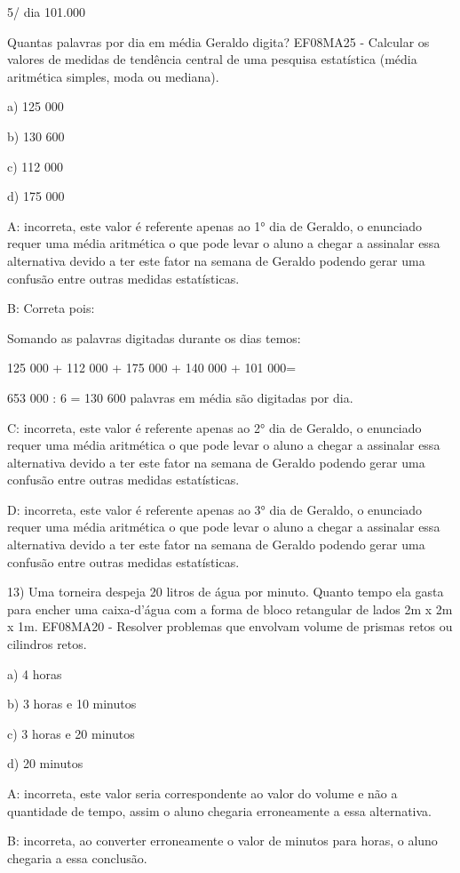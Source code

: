 {5/ dia 101.000

Quantas palavras por dia em média Geraldo digita? EF08MA25 - Calcular os
valores de medidas de tendência central de uma pesquisa estatística
(média aritmética simples, moda ou mediana).

a) 125 000

b) 130 600

c) 112 000

d) 175 000

A: incorreta, este valor é referente apenas ao 1° dia de Geraldo, o
enunciado requer uma média aritmética o que pode levar o aluno a chegar
a assinalar essa alternativa devido a ter este fator na semana de
Geraldo podendo gerar uma confusão entre outras medidas estatísticas.

B: Correta pois:

Somando as palavras digitadas durante os dias temos:

125 000 + 112 000 + 175 000 + 140 000 + 101 000=

653 000 : 6 = 130 600 palavras em média são digitadas por dia.

C: incorreta, este valor é referente apenas ao 2° dia de Geraldo, o
enunciado requer uma média aritmética o que pode levar o aluno a chegar
a assinalar essa alternativa devido a ter este fator na semana de
Geraldo podendo gerar uma confusão entre outras medidas estatísticas.

D: incorreta, este valor é referente apenas ao 3° dia de Geraldo, o
enunciado requer uma média aritmética o que pode levar o aluno a chegar
a assinalar essa alternativa devido a ter este fator na semana de
Geraldo podendo gerar uma confusão entre outras medidas estatísticas.

13) Uma torneira despeja 20 litros de água por minuto. Quanto tempo ela
gasta para encher uma caixa-d'água com a forma de bloco retangular de
lados 2m x 2m x 1m. EF08MA20 - Resolver problemas que envolvam volume de
prismas retos ou cilindros retos.

a) 4 horas

b) 3 horas e 10 minutos

c) 3 horas e 20 minutos

d) 20 minutos

A: incorreta, este valor seria correspondente ao valor do volume e não a
quantidade de tempo, assim o aluno chegaria erroneamente a essa
alternativa.

B: incorreta, ao converter erroneamente o valor de minutos para horas, o
aluno chegaria a essa conclusão.

}
